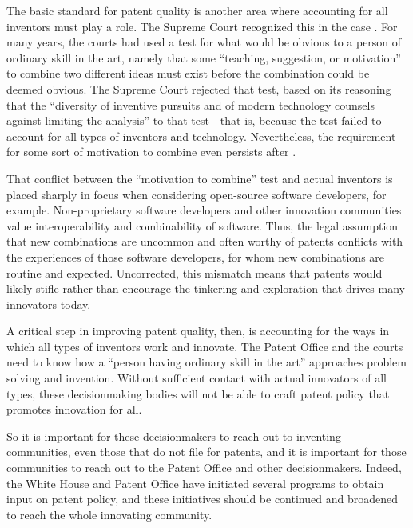\documentclass[11pt,twocolumn,titlepage]{article}
\begin{document}
The basic standard for patent quality is another area where accounting for all
inventors must play a role. The Supreme Court recognized this in the case
.\note{*} For many years, the courts had used a test for what would
be obvious to a person of ordinary skill in the art, namely that some
``teaching, suggestion, or motivation'' to combine two different ideas must
exist before the combination could be deemed obvious. The
Supreme Court rejected that test, based on its reasoning that the ``diversity of
inventive pursuits and of modern technology counsels against limiting the
analysis'' to that test---that is, because the test failed to account for all
types of inventors and technology. Nevertheless, the
requirement for some sort of motivation to combine even persists after
.

That conflict between the ``motivation to combine'' test and actual inventors is
placed sharply in focus when considering open-source software developers, for
example. Non-proprietary software developers and other innovation communities
value interoperability and combinability of software. Thus, the legal assumption
that new combinations are uncommon and often worthy of patents conflicts with
the experiences of those software developers, for whom new combinations are
routine and expected. Uncorrected, this mismatch means that patents would likely
stifle rather than encourage the tinkering and exploration that drives many
innovators today.

A critical step in improving patent quality, then, is accounting for the ways in
which all types of inventors work and innovate. The Patent Office and the courts
need to know how a ``person having ordinary skill in the art'' approaches
problem solving and invention. Without sufficient contact with actual innovators
of all types, these decisionmaking bodies will not be able to craft patent
policy that promotes innovation for all.

So it is important for these decisionmakers to reach out to inventing
communities, even those that do not file for patents, and it is important for
those communities to reach out to the Patent Office and other
decisionmakers. Indeed, the White House and
Patent Office have initiated several programs to obtain input on patent
policy, and these initiatives should
be continued and broadened to reach the whole innovating community.
\end{document}
